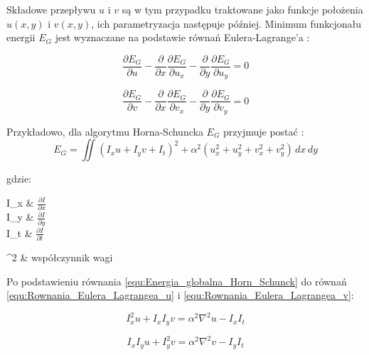 Składowe przepływu $u$ i $v$ są w tym przypadku traktowane jako funkcje położenia $u(x,y)$ i $v(x,y)$, ich parametryzacja następuje później. Minimum funkcjonału energii $E_G$ jest wyznaczane na podstawie równań Eulera-Lagrange'a \cite{Horn1981} \cite{Baker2011}:

\begin{equation}
\label{equ:Rownania_Eulera_Lagrangea_u}
	\frac{\partial E_G}{\partial u} - \frac{\partial}{\partial x} \frac{\partial E_G}{\partial u_x} - \frac{\partial}{\partial y} \frac{\partial E_G}{\partial u_y} = 0
\end{equation}

\begin{equation}
\label{equ:Rownania_Eulera_Lagrangea_v}
	\frac{\partial E_G}{\partial v} - \frac{\partial}{\partial x} \frac{\partial E_G}{\partial v_x} - \frac{\partial}{\partial y} \frac{\partial E_G}{\partial v_y} = 0
\end{equation}

Przykładowo, dla algorytmu Horna-Schuncka $E_G$ przyjmuje postać \cite{Horn1981}:
\begin{equation}
\label{equ:Energia_globalna_Horn_Schunck}
		E_G = \iint (I_x u + I_y v + I_t)^2 + \alpha^2 (u_x^2 + u_y^2 + v_x^2 + v_y^2) \,dx \,dy
\end{equation}

\noindent
gdzie:

\begin{conditionseq}
	 I_x & $\frac{\partial I}{\partial x}$ \\
	 I_y & $\frac{\partial I}{\partial y}$ \\
	 I_t & $\frac{\partial I}{\partial t}$ \\
\end{conditionseq}

\begin{conditions}
	 \alpha^2 & współczynnik wagi \\
\end{conditions}

Po podstawieniu równania \ref{equ:Energia_globalna_Horn_Schunck} do równań \ref{equ:Rownania_Eulera_Lagrangea_u} i \ref{equ:Rownania_Eulera_Lagrangea_v}:

\begin{equation}
\label{equ:Euler_Lagrange_Horn_Schunck_u}
	I_x^2 u + I_x I_y v = \alpha^2 \nabla^2 u - I_x I_t
\end{equation}

\begin{equation}
\label{equ:Euler_Lagrange_Horn_Schunck_v}
	I_x I_y u + I_y^2 v = \alpha^2 \nabla^2 v - I_y I_t
\end{equation}

